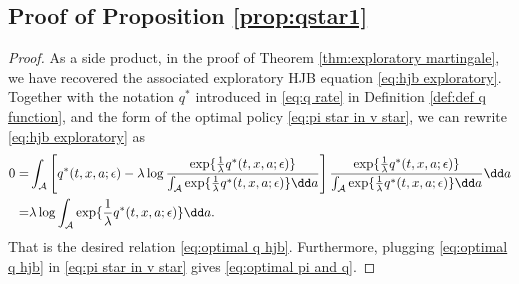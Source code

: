 \subsection{Proof of Proposition \ref{prop:qstar1}}
\begin{proof}
As a side product, in the proof of Theorem \ref{thm:exploratory martingale}, we have recovered the associated exploratory HJB equation \eqref{eq:hjb exploratory}. Together with the notation $q^*$ introduced in \eqref{eq:q rate} in Definition \ref{def:def q function}, and the form of the optimal policy \eqref{eq:pi star in v star}, we can rewrite \eqref{eq:hjb exploratory} as 
\[\begin{aligned}
0 = & \int_{{\cal A}} \left[ q^*(t,x,a;\epsilon) - \lambda\log\frac{\exp\{\frac{1}{\lambda}q^*(t,x,a;\epsilon)\}}{\int_{{\cal A}} \exp\{\frac{1}{\lambda}q^*(t,x,a;\epsilon)\} \dd a} \right]  \frac{\exp\{\frac{1}{\lambda}q^*(t,x,a;\epsilon)\}}{\int_{{\cal A}} \exp\{\frac{1}{\lambda}q^*(t,x,a;\epsilon)\} \dd a} \dd a \\
= & \lambda\log \int_{{\cal A}} \exp\{\frac{1}{\lambda}q^*(t,x,a;\epsilon)\} \dd a .
\end{aligned}  \]
That is the desired relation \eqref{eq:optimal q hjb}. Furthermore, plugging \eqref{eq:optimal q hjb} in  \eqref{eq:pi star in v star} gives \eqref{eq:optimal pi and q}.
\end{proof}

